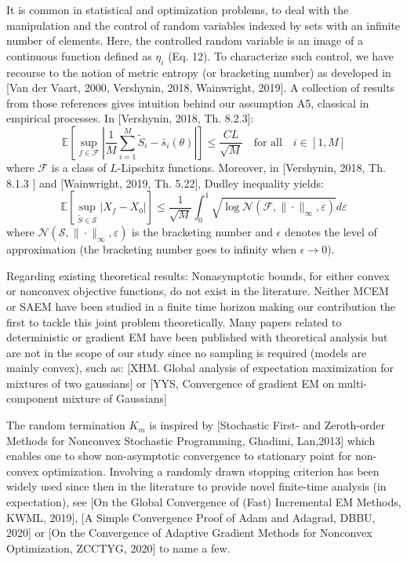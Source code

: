 \documentclass[anon,12pt]{alt2021} %
\begin{document}
It is common in statistical and optimization problems, to deal with the manipulation and the control of random variables indexed by sets with an infinite number of elements. 
Here, the controlled random variable is an image of a continuous function defined as $\eta_i$ (Eq. 12).
To characterize such control, we have recourse to the notion of metric entropy (or bracketing number) as developed in [Van der Vaart, 2000, Vershynin, 2018, Wainwright, 2019].
A collection of results from those references gives intuition behind our assumption A5, classical in empirical processes.
In [Vershynin, 2018, Th. 8.2.3]:
$$\mathbb{E} \left[\underset{f \in \mathcal{F}}{ \sup } \left|\frac{1}{M} \sum_{i=1}^{M} \tilde{S}_i- \bar{s}_i(\theta)\right| \right] \leq \frac{C L}{\sqrt{M}} \quad \textrm{for all} \quad  i \in [1, M]$$
where $\mathcal{F}$ is a class of $L$-Lipschitz functions.
Moreover, in [Vershynin, 2018, Th. 8.1.3 ] and [Wainwright, 2019, Th. 5.22], Dudley inequality yields:
$$\mathbb{E} [ \underset{\tilde{S} \in \mathcal{S}}{\sup} |X_{f}-X_{0} | ] \leq \frac{1}{\sqrt{M}} \int_{0}^{1} \sqrt{\log \mathcal{N}\left(\mathcal{F},\|\cdot\|_{\infty}, \varepsilon\right)} d \varepsilon $$
where $\mathcal{N}\left(\mathcal{S},\|\cdot\|_{\infty}, \varepsilon\right)$ is the bracketing number and $\epsilon$ denotes the level of approximation (the bracketing number goes to infinity when $\epsilon  \to 0$). 

Regarding existing theoretical results: Nonasymptotic bounds, for either convex or nonconvex objective functions, do not exist in the literature. 
Neither MCEM or SAEM have been studied in a finite time horizon making our contribution the first to tackle this joint problem theoretically.
Many papers related to deterministic or gradient EM have been published with theoretical analysis but are not in the scope of our study since no sampling is required (models are mainly convex), such as: [XHM. Global analysis of expectation maximization for mixtures of two gaussians] or [YYS, Convergence of gradient EM on multi-component mixture of Gaussians]

The random termination $K_m$ is inspired by [Stochastic First- and Zeroth-order Methods for Nonconvex Stochastic Programming, Ghadimi, Lan,2013] which enables one to show non-asymptotic convergence to stationary point for non-convex optimization. 
Involving a randomly drawn stopping criterion has been widely used since then in the literature to provide novel finite-time analysis (in expectation), see [On the Global Convergence of (Fast) Incremental EM Methods, KWML, 2019], [A Simple Convergence Proof of Adam and Adagrad, DBBU, 2020] or [On the Convergence of Adaptive Gradient Methods for Nonconvex Optimization, ZCCTYG, 2020] to name a few.
\end{document}

